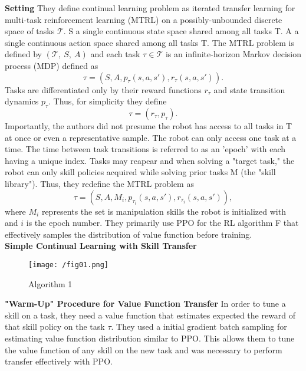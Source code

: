 \documentclass[12pt]{article}
\begin{document}
\noindent
\textbf{Setting}
They define continual learning problem as iterated transfer learning for
multi-task reinforcement learning (MTRL) on a possibly-unbounded discrete space
of tasks \(\mathcal{T}\).
S a single continuous state space shared among all tasks T.
A a single continuous action space shared among all tasks T.
The MTRL problem is defined by \((\mathcal{T},~S,~A)\) and each task
\(\tau \in \mathcal{T}\) is an infinite-horizon Markov decision process (MDP)
defined as
\begin{equation}
\tau = \left(S, A, p_{\tau} (s,a,s'), r_{\tau} (s,a,s') \right).
\end{equation}
\noindent
Tasks are differentiated only by their reward functions \(r_{\tau}\) and
state transition dynamics \(p_{\tau}\). Thus, for simplicity they define
\begin{equation}
\tau = \left( r_{\tau}, p_{\tau}\right).
\end{equation}
\noindent
Importantly, the authors did not presume the robot has access to all tasks in
T at once or even a representative sample. The robot can only access one task at
a time. The time between task transitions is referred to as an 'epoch' with
each having a unique index. Tasks may reapear and when solving a "target task,"
the robot can only skill policies acquired while solving prior tasks M (the
"skill library"). Thus, they redefine the MTRL problem as
\begin{equation}
\tau = \left(S, A, M_{i}, p_{\tau_{i}} (s,a,s'), r_{\tau_{i}} (s,a,s') \right),
\end{equation}
\noindent
where \(M_i\) represents the set is manipulation skills the robot is initialized
with and \(i\) is the epoch number.
They primarily use PPO \cite{schulman2017proximal} for the RL algorithm F that
effectively samples the distribution of value function before training.\\

\noindent
\textbf{Simple Continual Learning with Skill Transfer}\\
\begin{figure}[h]
  \centering
  \texttt{[image: /fig01.png]}
  \caption{Algorithm 1}
\end{figure}

\noindent
\textbf{"Warm-Up" Procedure for Value Function Transfer} In order to tune a
skill on a task, they need a value function that estimates expected the reward
of that skill policy on the task \(\tau\). They used a initial gradient batch
sampling for estimating value function distribution similar to PPO. This allows
them to tune the value function of any skill on the new task and was necessary
to perform transfer effectively with PPO.\\
\end{document}
